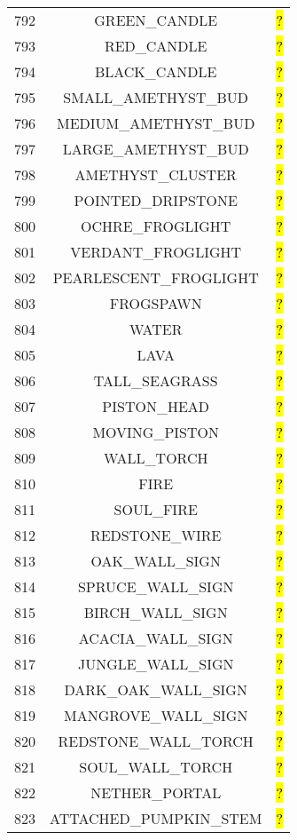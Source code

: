 \documentclass[11pt]{article}
\newcommand\myworries[1]{\sethlcolor{red}\hl{#1}}
\begin{document}
\begin{longtable}{ |c|c|c| }
	792 & GREEN\_CANDLE & \myworries{?} \\
	793 & RED\_CANDLE & \myworries{?} \\
	794 & BLACK\_CANDLE & \myworries{?} \\
	795 & SMALL\_AMETHYST\_BUD & \myworries{?} \\
	796 & MEDIUM\_AMETHYST\_BUD & \myworries{?} \\
	797 & LARGE\_AMETHYST\_BUD & \myworries{?} \\
	798 & AMETHYST\_CLUSTER & \myworries{?} \\
	799 & POINTED\_DRIPSTONE & \myworries{?} \\
	800 & OCHRE\_FROGLIGHT & \myworries{?} \\
	801 & VERDANT\_FROGLIGHT & \myworries{?} \\
	802 & PEARLESCENT\_FROGLIGHT & \myworries{?} \\
	803 & FROGSPAWN & \myworries{?} \\
	804 & WATER & \myworries{?} \\
	805 & LAVA & \myworries{?} \\
	806 & TALL\_SEAGRASS & \myworries{?} \\
	807 & PISTON\_HEAD & \myworries{?} \\
	808 & MOVING\_PISTON & \myworries{?} \\
	809 & WALL\_TORCH & \myworries{?} \\
	810 & FIRE & \myworries{?} \\
	811 & SOUL\_FIRE & \myworries{?} \\
	812 & REDSTONE\_WIRE & \myworries{?} \\
	813 & OAK\_WALL\_SIGN & \myworries{?} \\
	814 & SPRUCE\_WALL\_SIGN & \myworries{?} \\
	815 & BIRCH\_WALL\_SIGN & \myworries{?} \\
	816 & ACACIA\_WALL\_SIGN & \myworries{?} \\
	817 & JUNGLE\_WALL\_SIGN & \myworries{?} \\
	818 & DARK\_OAK\_WALL\_SIGN & \myworries{?} \\
	819 & MANGROVE\_WALL\_SIGN & \myworries{?} \\
	820 & REDSTONE\_WALL\_TORCH & \myworries{?} \\
	821 & SOUL\_WALL\_TORCH & \myworries{?} \\
	822 & NETHER\_PORTAL & \myworries{?} \\
	823 & ATTACHED\_PUMPKIN\_STEM & \myworries{?} \\

\end{longtable}
\end{document}
